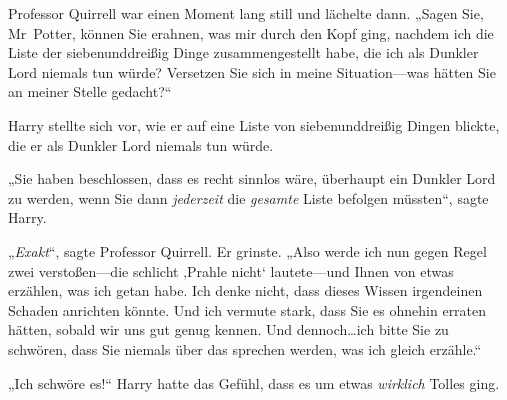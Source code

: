 Professor Quirrell war einen Moment lang still und lächelte dann. „Sagen Sie, Mr~Potter, können Sie erahnen, was mir durch den Kopf ging, nachdem ich die Liste der siebenunddreißig Dinge zusammengestellt habe, die ich als Dunkler Lord niemals tun würde? Versetzen Sie sich in meine Situation—was hätten Sie an meiner Stelle gedacht?“

Harry stellte sich vor, wie er auf eine Liste von siebenunddreißig Dingen blickte, die er als Dunkler Lord niemals tun würde.

„Sie haben beschlossen, dass es recht sinnlos wäre, überhaupt ein Dunkler Lord zu werden, wenn Sie dann \emph{jederzeit} die \emph{gesamte} Liste befolgen müssten“, sagte Harry.

„\emph{Exakt}“, sagte Professor Quirrell. Er grinste. „Also werde ich nun gegen Regel zwei verstoßen—die schlicht ‚Prahle nicht‘ lautete—und Ihnen von etwas erzählen, was ich getan habe. Ich denke nicht, dass dieses Wissen irgendeinen Schaden anrichten könnte. Und ich vermute stark, dass Sie es ohnehin erraten hätten, sobald wir uns gut genug kennen. Und dennoch…ich bitte Sie zu schwören, dass Sie niemals über das sprechen werden, was ich gleich erzähle.“

„Ich schwöre es!“ Harry hatte das Gefühl, dass es um etwas \emph{wirklich} Tolles ging.


